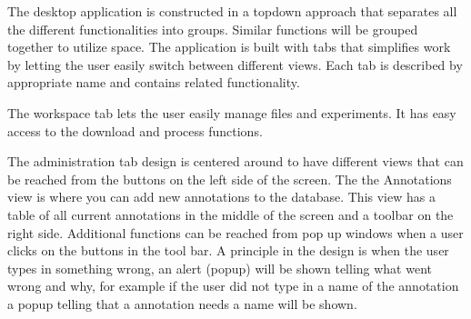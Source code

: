 The desktop application is constructed in a topdown approach that separates all the different functionalities into groups. Similar functions will be grouped together to utilize space.
The application is built with tabs that simplifies work by letting the user easily switch between different views. Each tab is described by appropriate name and contains related functionality.

The workspace tab lets the user easily manage files and experiments. It has easy access to the download and process functions.

The administration tab design is centered around to have different views that can be reached from the buttons on the left side of the screen. The the Annotations view is where you can add new annotations to the database. This view has a table of all current annotations in the middle of the screen and a toolbar on the right side. Additional functions can be reached from pop up windows when a user clicks on the buttons in the tool bar.
A principle in the design is when the user types in something wrong, an alert (popup) will be shown telling what went wrong and why, for example if the user did not type in a name of the annotation a popup telling that a annotation needs a name will be shown.  
\FloatBarrier

